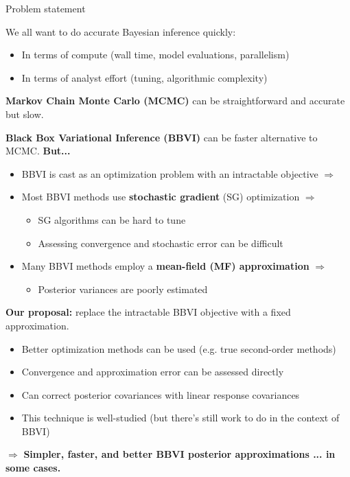 \documentclass[8pt]{beamer}\usepackage[]{graphicx}\usepackage[]{color}
\begin{document}
\begin{frame}{Problem statement}

We all want to do accurate Bayesian inference quickly:
%
\begin{itemize}
    \item In terms of compute (wall time, model evaluations, parallelism)
    \item In terms of analyst effort (tuning, algorithmic complexity)
\end{itemize}
%
\textbf{Markov Chain Monte Carlo (MCMC)} can be
straightforward and accurate but slow.

\pause
\vspace{-0.5em}
\hrulefill

\textbf{Black Box Variational Inference (BBVI)} can be faster alternative to MCMC.
%
\textbf{But...}

%
\begin{itemize}
    \item BBVI is cast as an optimization problem with an intractable objective $\Rightarrow$
    \item Most BBVI methods use \textbf{stochastic gradient} (SG) optimization $\Rightarrow$
    \begin{itemize}
        \item SG algorithms can be hard to tune
        \item Assessing convergence and stochastic error can be difficult
    \end{itemize}
    \item Many BBVI methods employ a \textbf{mean-field (MF) approximation} $\Rightarrow$
    \begin{itemize}
        \item Posterior variances are poorly estimated
    \end{itemize}
\end{itemize}
%
\pause
\vspace{-0.5em}
\hrulefill

\textbf{Our proposal:}
replace the intractable BBVI objective with a fixed approximation.
%
\begin{itemize}
    \item Better optimization methods can be used (e.g. true second-order methods)
    \item Convergence and approximation error can be assessed directly
    \item Can correct posterior covariances with linear response covariances
    \item This technique is well-studied (but there's still work to do in the context of BBVI)
\end{itemize}
%
$\Rightarrow$
\textbf{Simpler, faster, and better BBVI posterior approximations ... in some cases.}
%
\end{frame}
\end{document}
